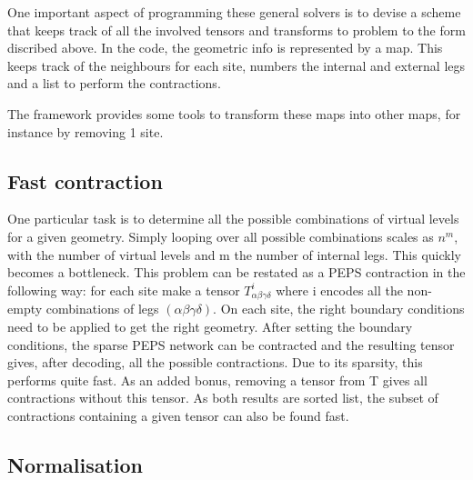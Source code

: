 One important aspect of programming these general solvers is to devise a scheme that keeps track of all the involved tensors and transforms to problem to the form discribed above. In the code, the geometric info is represented by a map. This keeps track of the neighbours for each site, numbers the internal and external legs and a list to perform the contractions.

The framework provides some tools to transform these maps into other maps, for instance by removing 1 site.

\subsection{Fast contraction}

One particular task is to determine all the possible combinations of virtual levels for a given geometry. Simply looping over all possible combinations scales as $n^m$, with the number of virtual levels and m the number of internal legs. This quickly becomes a bottleneck.
This problem can be restated as a PEPS contraction in the following way: for each site make a tensor $ T^{i}_{  \alpha \beta \gamma \delta } $ where i encodes all the non-empty combinations of legs $(\alpha \beta \gamma \delta)$. On each site, the right boundary conditions need to be applied to get the right geometry. After setting the boundary conditions, the sparse PEPS network can be contracted and the resulting tensor gives, after decoding, all the possible contractions. Due to its sparsity, this performs quite fast.
As an added bonus, removing a tensor from T gives all contractions without this tensor. As both results are sorted list, the subset of contractions containing a given tensor can also be found fast.

\subsection{Normalisation}

